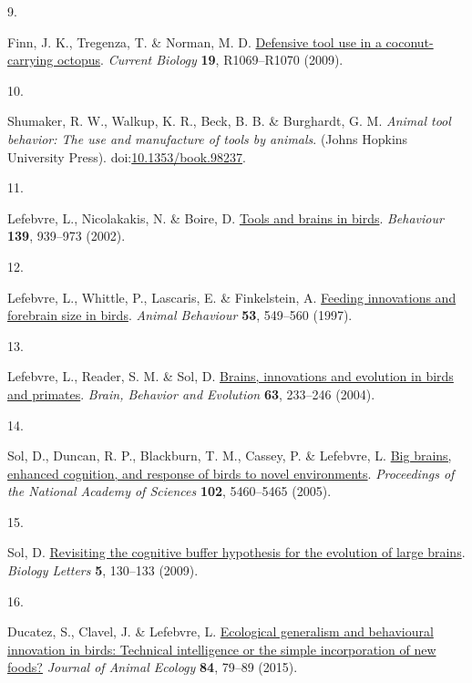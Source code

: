 \documentclass[
  man,floatsintext]{apa6}
\newlength{\cslhangindent}
\newlength{\csllabelwidth}
\newlength{\cslentryspacingunit} %
\newenvironment{CSLReferences}[2] %
 {%
  \setlength{\parindent}{0pt}
  \ifodd #1
  \let\oldpar\par
  \def\par{\hangindent=\cslhangindent\oldpar}
  \fi
  \setlength{\parskip}{#2\cslentryspacingunit}
 }%
 {}
\newcommand{\CSLLeftMargin}[1]{\parbox[t]{\csllabelwidth}{#1}}
\newcommand{\CSLRightInline}[1]{\parbox[t]{\linewidth - \csllabelwidth}{#1}\break}
\begin{document}
\begin{CSLReferences}{0}{0}
\leavevmode{}%
\CSLLeftMargin{9. }%
\CSLRightInline{Finn, J. K., Tregenza, T. \& Norman, M. D. \href{https://doi.org/10.1016/j.cub.2009.10.052}{Defensive tool use in a coconut-carrying octopus}. \emph{Current Biology} \textbf{19}, R1069--R1070 (2009).}

\leavevmode{}%
\CSLLeftMargin{10. }%
\CSLRightInline{Shumaker, R. W., Walkup, K. R., Beck, B. B. \& Burghardt, G. M. \emph{Animal tool behavior: The use and manufacture of tools by animals}. (Johns Hopkins University Press). doi:\href{https://doi.org/10.1353/book.98237}{10.1353/book.98237}.}

\leavevmode{}%
\CSLLeftMargin{11. }%
\CSLRightInline{Lefebvre, L., Nicolakakis, N. \& Boire, D. \href{https://doi.org/10.1163/156853902320387918}{Tools and brains in birds}. \emph{Behaviour} \textbf{139}, 939--973 (2002).}

\leavevmode{}%
\CSLLeftMargin{12. }%
\CSLRightInline{Lefebvre, L., Whittle, P., Lascaris, E. \& Finkelstein, A. \href{https://doi.org/10.1006/anbe.1996.0330}{Feeding innovations and forebrain size in birds}. \emph{Animal Behaviour} \textbf{53}, 549--560 (1997).}

\leavevmode{}%
\CSLLeftMargin{13. }%
\CSLRightInline{Lefebvre, L., Reader, S. M. \& Sol, D. \href{https://doi.org/10.1159/000076784}{Brains, innovations and evolution in birds and primates}. \emph{Brain, Behavior and Evolution} \textbf{63}, 233--246 (2004).}

\leavevmode{}%
\CSLLeftMargin{14. }%
\CSLRightInline{Sol, D., Duncan, R. P., Blackburn, T. M., Cassey, P. \& Lefebvre, L. \href{https://doi.org/10.1073/pnas.0408145102}{Big brains, enhanced cognition, and response of birds to novel environments}. \emph{Proceedings of the National Academy of Sciences} \textbf{102}, 5460--5465 (2005).}

\leavevmode{}%
\CSLLeftMargin{15. }%
\CSLRightInline{Sol, D. \href{https://doi.org/10.1098/rsbl.2008.0621}{Revisiting the cognitive buffer hypothesis for the evolution of large brains}. \emph{Biology Letters} \textbf{5}, 130--133 (2009).}

\leavevmode{}%
\CSLLeftMargin{16. }%
\CSLRightInline{Ducatez, S., Clavel, J. \& Lefebvre, L. \href{https://doi.org/10.1111/1365-2656.12255}{Ecological generalism and behavioural innovation in birds: Technical intelligence or the simple incorporation of new foods?} \emph{Journal of Animal Ecology} \textbf{84}, 79--89 (2015).}


\end{CSLReferences}
\end{document}

